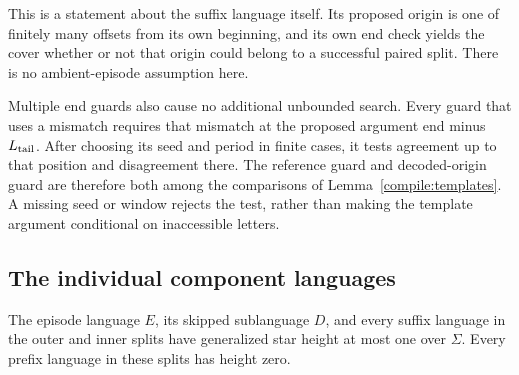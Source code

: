 This is a statement about the suffix language itself. Its proposed origin
is one of finitely many offsets from its own beginning, and its own end
check yields the cover whether or not that origin could belong to a
successful paired split. There is no ambient-episode assumption here.

Multiple end guards also cause no additional unbounded search. Every
guard that uses a mismatch requires that mismatch at the proposed
argument end minus $L_{\rm tail}$. After choosing its seed and period in
finite cases, it tests agreement up to that position and disagreement
there. The reference guard and decoded-origin guard are therefore both
among the comparisons of Lemma~\ref{compile:templates}. A missing seed
or window rejects the test, rather than making the template argument
conditional on inaccessible letters.

\subsection{The individual component languages}

\begin{proposition}\label{compile:components}
The episode language $E$, its skipped sublanguage $D$, and every suffix
language in the outer and inner splits have generalized star height at
most one over $\Sigma$. Every prefix language in these splits has height
zero.
\end{proposition}

